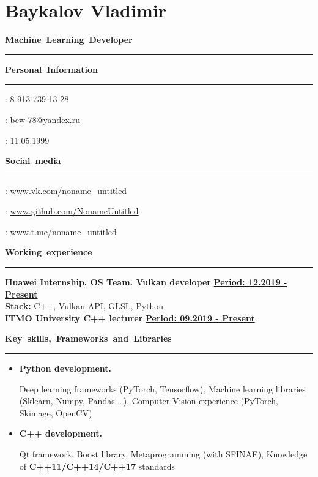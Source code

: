 \documentclass[11pt,a4paper]{report}
\author{Baykalov Vladimir}
\begin{document}
\section*{Baykalov Vladimir}

\par\hbox{\Large\textbf{Machine Learning Developer}}\kern3pt\hrule\kern1pt

\begin{multicols}{2}
\par\hbox{\Large\textbf{Personal Information}}\kern5pt\hrule\kern5pt

\faPhone: 8-913-739-13-28

\Letter: bew-78@yandex.ru

\faBirthdayCake: 11.05.1999

\par\hbox{\Large\textbf{Social media}}\kern5pt\hrule\kern5pt

\faVk: \href{http://www.vk.com/noname_untitled}{www.vk.com/noname\_untitled}

\faGithub:  \href{http://www.github.com/NonameUntitled}{www.github.com/NonameUntitled}

\faSend:  \href{http://www.t.me/noname\_untitled}{www.t.me/noname\_untitled}

\end{multicols}

\par\hbox{\Large\textbf{Working experience}}\kern3pt\hrule\kern10pt

\textbf {Huawei Internship. OS Team. Vulkan developer }
\hfill
\textbf {\underline{Period: 12.2019 - Present}} \\
\textbf{Stack:} C++, Vulkan API, GLSL, Python \\


\textbf {ITMO University C++ lecturer}
\hfill
\textbf {\underline{Period: 09.2019 - Present}} \\


\par\hbox{\Large\textbf{Key skills, Frameworks and Libraries}}\kern5pt\hrule\kern5pt

\begin{itemize}[label={}]

\item \textbf{Python development.}

Deep learning frameworks (PyTorch, Tensorflow), Machine learning libraries (Sklearn, Numpy, Pandas \dots), Computer Vision experience (PyTorch, Skimage, OpenCV)

\item \textbf{C++ development.}

Qt framework, Boost library, Metaprogramming (with SFINAE), Knowledge of \textbf{C++11/C++14/C++17} standards
\end{itemize}
\end{document}
